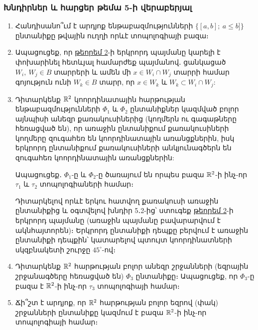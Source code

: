 \bigskip
\bigskip
\subsubsection*{Խնդիրներ և հարցեր թեմա 5-ի վերաբերյալ}

\begin{enumerate}[label=\thesection.\arabic*.]
\item Հանդիսանո՞ւմ է արդյոք ենթաբազմությունների $\{[a, b];\ a\le b]\}$ ընտանիքը թվային ուղղի որևէ տոպոլոգիայի բազա։

\item Ապացուցեք, որ \hyperref[ch5thm2]{թեորեմ 2}-ի երկրորդ պայմանը կարելի է փոխարինել հետև\-յալ համարժեք պայմանով․ ցանկացած  $W_i,\  W_j \in B$ տարրերի և ամեն մի \linebreak $x \in W_i \cap W_j$ տարրի համար գոյություն ունի $W_k \in B$ տարր, որ $x \in W_k$ և  \linebreak $W_k \subset W_i \cap W_j$: 

\item Դիտարկենք $\mathbb{R}^2$ կոորդինատային հարթության ենթաբազմությունների $\Phi_1$  \linebreak և $\Phi_2$ ընտանիքներ կազմված բոլոր այնպիսի անեզր քառակուսիներից (կող\-մերն ու գագաթները հեռացված են), որ առաջին ընտանիքում քառակուսիների \linebreak  կող\-մերը զուգահեռ են կոորդինատային առանցքներին, իսկ երկրորդ ընտա\-նի\-քում քառակուսիների անկյունագծերն են զուգահեռ կոորդինատային առանցք\-նե\-րին:

    
Ապացուցեք․ $\Phi_1$-ը և $\Phi_2$-ը ծառայում են որպես բազա $\mathbb{R}^2$-ի ինչ-որ $\tau_1$ և $\tau_2$ տոպոլոգիաների համար։

\begin{hint}
Դիտարկելով որևէ երկու հատվող քառակուսի առաջին ընտանի\-քից և օգտվելով խնդիր 5․2-ից՝ ստուգեք \hyperref[ch5thm2]{թեորեմ 2}-ի երկրորդ պայմանը (առա\-ջին պայմանը բավարարվում է ակնհայտորեն)։ Երկրորդ ընտանիքի դեպքը բեր\-վում է առաջին ընտանիքի դեպքին՝ կատարելով պտույտ կոորդինատների սկզբնա\-կետի շուրջը $45^\circ$-ով։
\end{hint}

\item Դիտարկենք $\mathbb{R}^2$ հարթության բոլոր անեզր շրջանների (եզրային շրջանագծերը հեռացված են) $\Phi_3$ ընտանիքը։ Ապացուցեք, որ $\Phi_3$-ը բազա է $\mathbb{R}^2$-ի ինչ-որ $\tau_3$ տոպոլոգիայի համար։

\item Ճի՞շտ է արդյոք, որ $\mathbb{R}^2$ հարթության բոլոր եզրով (փակ) շրջանների ընտանիքը կազմում է բազա $\mathbb{R}^2$-ի ինչ-որ տոպոլոգիայի համար։
 

\end{enumerate}
